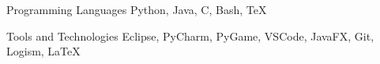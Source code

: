 
\begin{cvskills}
  \cvskill
    {Programming Languages} %
    {Python, Java, C, Bash, TeX} %

  \cvskill
    {Tools and Technologies} %
    {Eclipse, PyCharm, PyGame, VSCode, JavaFX, Git, Logism, LaTeX} %
\end{cvskills}
